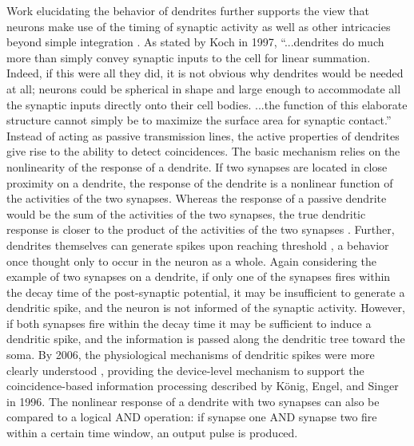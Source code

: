 \documentclass[twocolumn]{article}
\begin{document}
Work elucidating the behavior of dendrites further supports the view that neurons make use of the timing of synaptic activity as well as other intricacies beyond simple integration \cite{stsp2015}. As stated by Koch in 1997, ``...dendrites do much more than simply convey synaptic inputs to the cell for linear summation. Indeed, if this were all they did, it is not obvious why dendrites would be needed at all; neurons could be spherical in shape and large enough to accommodate all the synaptic inputs directly onto their cell bodies. ...the function of this elaborate structure cannot simply be to maximize the surface area for synaptic contact.'' \cite{ko1997} Instead of acting as passive transmission lines, the active properties of dendrites \cite{joma1996} give rise to the ability to detect coincidences. The basic mechanism relies on the nonlinearity of the response of a dendrite. If two synapses are located in close proximity on a dendrite, the response of the dendrite is a nonlinear function of the activities of the two synapses. Whereas the response of a passive dendrite would be the sum of the activities of the two synapses, the true dendritic response is closer to the product of the activities of the two synapses \cite{ko1997}. Further, dendrites themselves can generate spikes upon reaching threshold \cite{hoko2006}, a behavior once thought only to occur in the neuron as a whole. Again considering the example of two synapses on a dendrite, if only one of the synapses fires within the decay time of the post-synaptic potential, it may be insufficient to generate a dendritic spike, and the neuron is not informed of the synaptic activity. However, if both synapses fire within the decay time it may be sufficient to induce a dendritic spike, and the information is passed along the dendritic tree toward the soma. By 2006, the physiological mechanisms of dendritic spikes were more clearly understood \cite{hoko2006}, providing the device-level mechanism to support the coincidence-based information processing described by K\"{o}nig, Engel, and Singer in 1996. The nonlinear response of a dendrite with two synapses can also be compared to a logical AND operation: if synapse one AND synapse two fire within a certain time window, an output pulse is produced. 
\end{document}
